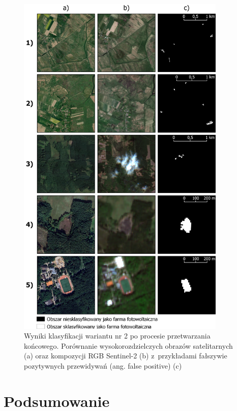 \documentclass{amuthesis}
\begin{document}
\begin{figure}[t]

{\centering \includegraphics[width=0.89\textwidth,height=\textheight]{figures/incorrect_dataset2.png}

}

\caption{\label{fig-rycina-falsepositive-dataset2}Wyniki klasyfikacji
wariantu nr 2 po procesie przetwarzania końcowego. Porównanie
wysokorozdzielczych obrazów satelitarnych (a) oraz kompozycji RGB
Sentinel-2 (b) z~przykładami fałszywie pozytywnych przewidywań (ang.
false positive) (c)}

\end{figure}


\hypertarget{podsumowanie}{%
\chapter{Podsumowanie}\label{podsumowanie}}
\end{document}
